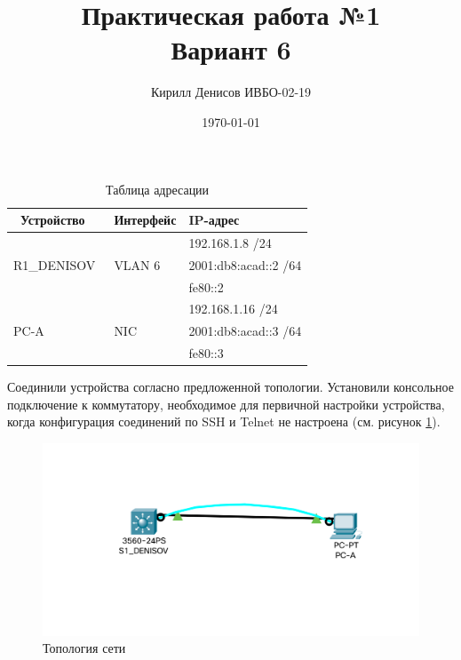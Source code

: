 \documentclass[a4paper,14pt]{extarticle}
\author{Кирилл Денисов ИВБО-02-19}
\title{Практическая работа №1\\Вариант 6}
\date{\today}
\newcommand{\pathToCommonFolder}{/home/denilai/Documents/repos/latex/Common}
\newcommand{\router}{R1\_DENISOV~}
\begin{document}
	\newpage
	\newpage
\maketitle


\begin{table}[htbp]
	\begin{center}
		\caption{Таблица адресации}
		\begin{tabular}{|l|l|l|}
			\hline\
			\textbf{Устройство}  & \textbf{Интерфейс} & \textbf{IP-адрес} \\ \hline
			\multirow{3}{*}{\router} & \multirow{3}{*}{VLAN 6}    & 192.168.1.8 /24 \\\cline{3-3}
			& & 2001:db8:acad::2 /64 \\\cline{3-3}
			& & fe80::2 \\\hline
			\multirow{3}{*}{PC-A}   & 	\multirow{3}{*}{NIC}    & 192.168.1.16 /24  \\\cline{3-3}
			                        &                           & 2001:db8:acad::3 /64\\\cline{3-3}
			                        &  &fe80::3\\\hline
		\end{tabular}
		\label{tab:adress}
	\end{center}
\end{table}


Соединили устройства согласно предложенной топологии. Установили консольное подключение к коммутатору, необходимое для первичной настройки устройства, когда конфигурация соединений по SSH и Telnet не настроена (см. рисунок \ref{fig:topology}).

\begin{figure}[h!]
	\centering
	\includegraphics[width=0.6\linewidth]{images/topology}
	\caption{Топология сети}
	\label{fig:topology}
\end{figure}
\end{document}
